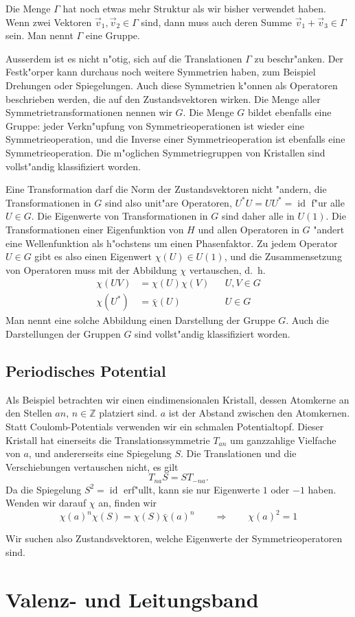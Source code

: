 Die Menge $\Gamma$ hat noch etwas mehr Struktur als wir bisher
verwendet haben.
Wenn zwei Vektoren $\vec v_1,\vec v_2\in\Gamma$ sind, dann muss
auch deren Summe $\vec v_1+\vec v_3\in\Gamma$ sein.
Man nennt $\Gamma$ eine Gruppe.

Ausserdem ist es nicht n"otig, sich auf die Translationen $\Gamma$
zu beschr"anken.
Der Festk"orper kann durchaus noch weitere Symmetrien haben, zum
Beispiel Drehungen oder Spiegelungen.
Auch diese Symmetrien k"onnen als Operatoren beschrieben
werden, die auf den Zustandsvektoren wirken.
Die Menge aller Symmetrietransformationen nennen wir $G$.
Die Menge $G$ bildet ebenfalls eine Gruppe: jeder Verkn"upfung von
Symmetrieoperationen ist wieder eine Symmetrieoperation, und die
Inverse einer Symmetrieoperation ist ebenfalls eine Symmetrieoperation.
Die m"oglichen Symmetriegruppen von Kristallen sind vollst"andig
klassifiziert worden.

Eine Transformation darf die Norm der Zustandsvektoren nicht "andern,
die Transformationen in $G$ sind also unit"are Operatoren,
$U^*U=UU^*=\operatorname{id}$ f"ur alle $U\in G$.
Die Eigenwerte von Transformationen in $G$ sind daher alle in $U(1)$.
Die Transformationen einer Eigenfunktion von $H$ und allen Operatoren in $G$
"andert eine Wellenfunktion als h"ochstens um einen Phasenfaktor.
Zu jedem Operator $U\in G$ gibt es also einen Eigenwert $\chi(U)\in U(1)$,
und die Zusammensetzung von Operatoren muss mit der Abbildung $\chi$
vertauschen, d.~h.
\[
\begin{aligned}
\chi(UV)&=\chi(U)\chi(V)&&U,V\in G\\
\chi(U^*)&=\bar\chi(U)&&U\in G
\end{aligned}
\]
Man nennt eine solche Abbildung einen Darstellung der Gruppe $G$.
Auch die Darstellungen der Gruppen $G$ sind vollst"andig klassifiziert
worden.

\subsection{Periodisches Potential}
Als Beispiel betrachten wir einen eindimensionalen Kristall, dessen
Atomkerne an den Stellen $an$, $n\in\mathbb Z$ platziert sind.
$a$ ist der Abstand zwischen den Atomkernen.
Statt Coulomb-Potentials verwenden wir ein schmalen Potentialtopf.
Dieser Kristall hat einerseits die Translationssymmetrie $T_{an}$ um
ganzzahlige Vielfache von $a$, und andererseits eine Spiegelung $S$.
Die Translationen und die Verschiebungen vertauschen nicht, es gilt
\[
T_{na}S=ST_{-na}.
\]
Da die Spiegelung $S^2=\operatorname{id}$ erf"ullt, kann sie nur
Eigenwerte $1$ oder $-1$ haben.
Wenden wir darauf $\chi$ an, finden wir
\[
\chi(a)^n\chi(S)=\chi(S)\bar\chi(a)^n
\qquad \Rightarrow \qquad
\chi(a)^2=1
\]

Wir suchen also Zustandsvektoren, welche Eigenwerte der
Symmetrieoperatoren sind.

\section{Valenz- und Leitungsband}



